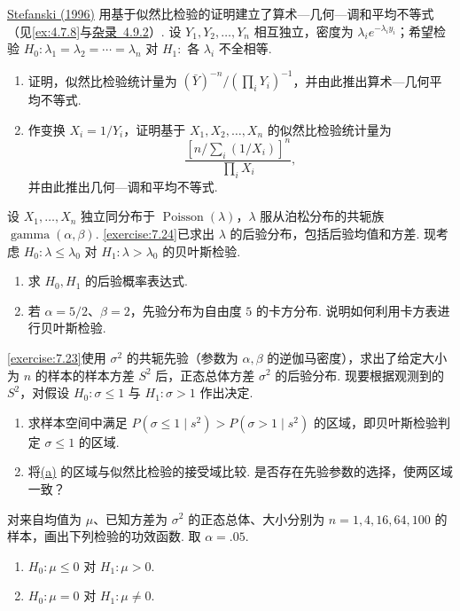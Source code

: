\begin{exercise}\label{exercise:8.9}
\hyperref[bib:source300]{Stefanski (1996)} 用基于似然比检验的证明建立了算术—几何—调和平均不等式（见\autoref{ex:4.7.8}与\hyperref[sec:4.9.2]{杂录~4.9.2}\mbox{）.} 设 $Y_1,Y_2,\ldots,Y_n$ 相互独立，密度为 $\lambda_i e^{-\lambda_i y_i}$；希望检验 $H_0:\lambda_1=\lambda_2=\cdots=\lambda_n$ 对 $H_1:$ 各 $\lambda_i$ 不全相等.
\begin{enumerate}
\item 证明，似然比检验统计量为 $(\bar Y)^{-n}/(\prod_iY_i)^{-1}$，并由此推出算术—几何平均不等式.
\item 作变换 $X_i=1/Y_i$，证明基于 $X_1,X_2,\ldots,X_n$ 的似然比检验统计量为
$$\frac{[n/\sum_i(1/X_i)]^n}{\prod_iX_i},$$
并由此推出几何—调和平均不等式.
\end{enumerate}
\end{exercise}
\begin{exercise}\label{exercise:8.10}
设 $X_1,\ldots,X_n$ 独立同分布于 $\operatorname{Poisson}(\lambda)$，$\lambda$ 服从泊松分布的共轭族 $\operatorname{gamma}(\alpha,\beta)$. \autoref{exercise:7.24}已求出 $\lambda$ 的后验分布，包括后验均值和方差. 现考虑 $H_0:\lambda\le\lambda_0$ 对 $H_1:\lambda>\lambda_0$ 的贝叶斯检验.
\begin{enumerate}
\item 求 $H_0,H_1$ 的后验概率表达式.
\item 若 $\alpha=5/2$、$\beta=2$，先验分布为自由度 $5$ 的卡方分布. 说明如何利用卡方表进行贝叶斯检验.
\end{enumerate}
\end{exercise}
\begin{exercise}\label{exercise:8.11}
\autoref{exercise:7.23}使用 $\sigma^2$ 的共轭先验（参数为 $\alpha,\beta$ 的逆伽马密度），求出了给定大小为 $n$ 的样本的样本方差 $S^2$ 后，正态总体方差 $\sigma^2$ 的后验分布. 现要根据观测到的 $S^2$，对假设 $H_0:\sigma\le1$ 与 $H_1:\sigma>1$ 作出决定.
\begin{enumerate}
\item{}\label{itm:exercise:8.11:a} 求样本空间中满足 $P(\sigma\le1\mid s^2)>P(\sigma>1\mid s^2)$ 的区域，即贝叶斯检验判定 $\sigma\le1$ 的区域.
\item 将\hyperref[itm:exercise:8.11:a]{(a)} 的区域与似然比检验的接受域比较. 是否存在先验参数的选择，使两区域一致？
\end{enumerate}
\end{exercise}
\begin{exercise}\label{exercise:8.12}
对来自均值为 $\mu$、已知方差为 $\sigma^2$ 的正态总体、大小分别为 $n=1,4,16,64,100$ 的样本，画出下列检验的功效函数. 取 $\alpha=.05$.
\begin{enumerate}
\item $H_0:\mu\le0$ 对 $H_1:\mu>0$.
\item $H_0:\mu=0$ 对 $H_1:\mu\ne0$.
\end{enumerate}
\end{exercise}
